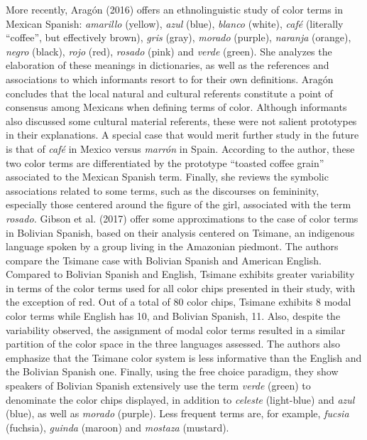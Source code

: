\documentclass[
  english,
  ,man,floatsintext]{apa6}
\begin{document}
More recently, Aragón (2016) offers an ethnolinguistic study of color terms in Mexican Spanish: \emph{amarillo} (yellow), \emph{azul} (blue), \emph{blanco} (white), \emph{café} (literally \enquote{coffee}, but effectively brown), \emph{gris} (gray), \emph{morado} (purple), \emph{naranja} (orange), \emph{negro} (black), \emph{rojo} (red), \emph{rosado} (pink) and \emph{verde} (green). She analyzes the elaboration of these meanings in dictionaries, as well as the references and associations to which informants resort to for their own definitions. Aragón concludes that the local natural and cultural referents constitute a point of consensus among Mexicans when defining terms of color. Although informants also discussed some cultural material referents, these were not salient prototypes in their explanations. A special case that would merit further study in the future is that of \emph{café} in Mexico versus \emph{marrón} in Spain. According to the author, these two color terms are differentiated by the prototype \enquote{toasted coffee grain} associated to the Mexican Spanish term. Finally, she reviews the symbolic associations related to some terms, such as the discourses on femininity, especially those centered around the figure of the girl, associated with the term \emph{rosado.}
Gibson et al. (2017) offer some approximations to the case of color terms in Bolivian Spanish, based on their analysis centered on Tsimane, an indigenous language spoken by a group living in the Amazonian piedmont. The authors compare the Tsimane case with Bolivian Spanish and American English. Compared to Bolivian Spanish and English, Tsimane exhibits greater variability in terms of the color terms used for all color chips presented in their study, with the exception of red. Out of a total of 80 color chips, Tsimane exhibits 8 modal color terms while English has 10, and Bolivian Spanish, 11. Also, despite the variability observed, the assignment of modal color terms resulted in a similar partition of the color space in the three languages assessed. The authors also emphasize that the Tsimane color system is less informative than the English and the Bolivian Spanish one. Finally, using the free choice paradigm, they show speakers of Bolivian Spanish extensively use the term \emph{verde} (green) to denominate the color chips displayed, in addition to \emph{celeste} (light-blue) and \emph{azul} (blue), as well as \emph{morado} (purple). Less frequent terms are, for example, \emph{fucsia} (fuchsia), \emph{guinda} (maroon) and \emph{mostaza} (mustard).
\end{document}
